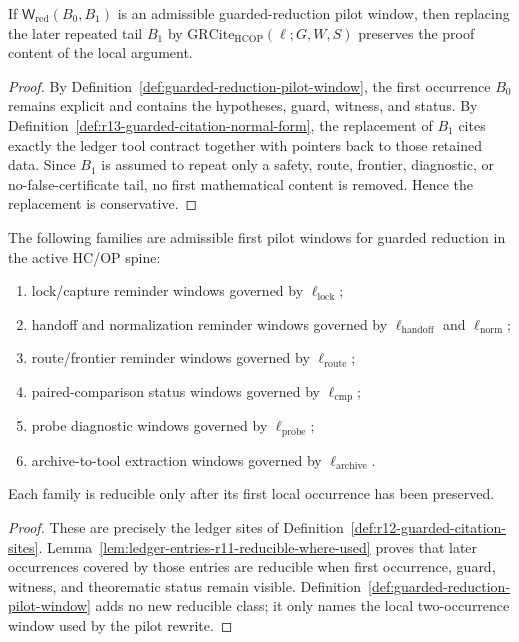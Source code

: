 \begin{lemma}
\label{lem:pilot-normal-form-is-conservative}
If \(\mathsf W_{\mathrm{red}}(B_0,B_1)\) is an admissible guarded-reduction pilot window, then replacing the later repeated tail \(B_1\) by \(\mathrm{GRCite}_{\mathrm{HCOP}}(\ell;G,W,S)\) preserves the proof content of the local argument.
\end{lemma}

\begin{proof}
By Definition~\ref{def:guarded-reduction-pilot-window}, the first occurrence \(B_0\) remains explicit and contains the hypotheses, guard, witness, and status. By Definition~\ref{def:r13-guarded-citation-normal-form}, the replacement of \(B_1\) cites exactly the ledger tool contract together with pointers back to those retained data. Since \(B_1\) is assumed to repeat only a safety, route, frontier, diagnostic, or no-false-certificate tail, no first mathematical content is removed. Hence the replacement is conservative.
\end{proof}

\begin{proposition}
\label{prop:allowed-pilot-windows-active-hcop-spine}
The following families are admissible first pilot windows for guarded reduction in the active HC/OP spine:
\begin{enumerate}[leftmargin=2em,label=(\roman*)]
 \item lock/capture reminder windows governed by \(\ell_{\mathrm{lock}}\);
 \item handoff and normalization reminder windows governed by \(\ell_{\mathrm{handoff}}\) and \(\ell_{\mathrm{norm}}\);
 \item route/frontier reminder windows governed by \(\ell_{\mathrm{route}}\);
 \item paired-comparison status windows governed by \(\ell_{\mathrm{cmp}}\);
 \item probe diagnostic windows governed by \(\ell_{\mathrm{probe}}\);
 \item archive-to-tool extraction windows governed by \(\ell_{\mathrm{archive}}\).
\end{enumerate}
Each family is reducible only after its first local occurrence has been preserved.
\end{proposition}

\begin{proof}
These are precisely the ledger sites of Definition~\ref{def:r12-guarded-citation-sites}. Lemma~\ref{lem:ledger-entries-r11-reducible-where-used} proves that later occurrences covered by those entries are reducible when first occurrence, guard, witness, and theorematic status remain visible. Definition~\ref{def:guarded-reduction-pilot-window} adds no new reducible class; it only names the local two-occurrence window used by the pilot rewrite.
\end{proof}

